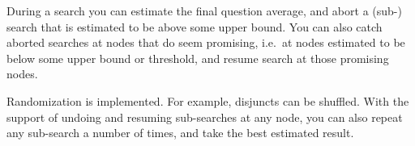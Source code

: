 \documentclass[twoside,twocolumn,a4paper,11pt]{article}
\theoremstyle{definition}
\begin{document}

During a search you can estimate the final question average,
and abort a (sub-) search that is estimated to be above some upper bound. You can also
catch aborted searches at nodes that do seem promising, i.e.\ at nodes estimated
to be below some upper bound or threshold, and resume search at those promising nodes.
%

Randomization is implemented. For example, disjuncts can be shuffled.
With the support of undoing and resuming sub-searches at any node,
you can also repeat any sub-search a number of times, and take the best estimated
result.

\end{document}
